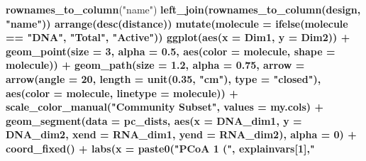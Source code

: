\documentclass[]{article}
\newenvironment{Shaded}{\begin{snugshade}}{\end{snugshade}}
\newcommand{\KeywordTok}[1]{\textcolor[rgb]{0.13,0.29,0.53}{\textbf{#1}}}
\newcommand{\DataTypeTok}[1]{\textcolor[rgb]{0.13,0.29,0.53}{#1}}
\newcommand{\DecValTok}[1]{\textcolor[rgb]{0.00,0.00,0.81}{#1}}
\newcommand{\FloatTok}[1]{\textcolor[rgb]{0.00,0.00,0.81}{#1}}
\newcommand{\StringTok}[1]{\textcolor[rgb]{0.31,0.60,0.02}{#1}}
\newcommand{\OperatorTok}[1]{\textcolor[rgb]{0.81,0.36,0.00}{\textbf{#1}}}
\newcommand{\NormalTok}[1]{#1}
\begin{document}
\begin{Shaded}
\begin{Highlighting}[]
{{{{{\StringTok{  }\KeywordTok{rownames_to_column}\NormalTok{(}\StringTok{"name"}\NormalTok{) }\OperatorTok{%
\StringTok{  }\KeywordTok{left_join}\NormalTok{(}\KeywordTok{rownames_to_column}\NormalTok{(design, }\StringTok{"name"}\NormalTok{)) }\OperatorTok{%
\StringTok{  }\KeywordTok{arrange}\NormalTok{(}\KeywordTok{desc}\NormalTok{(distance)) }\OperatorTok{%
\StringTok{  }\KeywordTok{mutate}\NormalTok{(}\DataTypeTok{molecule =} \KeywordTok{ifelse}\NormalTok{(molecule }\OperatorTok{==}\StringTok{ "DNA"}\NormalTok{, }\StringTok{"Total"}\NormalTok{, }\StringTok{"Active"}\NormalTok{)) }\OperatorTok{%
\StringTok{  }\KeywordTok{ggplot}\NormalTok{(}\KeywordTok{aes}\NormalTok{(}\DataTypeTok{x =}\NormalTok{ Dim1, }\DataTypeTok{y =}\NormalTok{ Dim2)) }\OperatorTok{+}
\StringTok{  }\KeywordTok{geom_point}\NormalTok{(}\DataTypeTok{size =} \DecValTok{3}\NormalTok{, }\DataTypeTok{alpha =} \FloatTok{0.5}\NormalTok{, }\KeywordTok{aes}\NormalTok{(}\DataTypeTok{color =}\NormalTok{ molecule, }\DataTypeTok{shape =}\NormalTok{ molecule)) }\OperatorTok{+}\StringTok{ }
\StringTok{  }\KeywordTok{geom_path}\NormalTok{(}\DataTypeTok{size =} \FloatTok{1.2}\NormalTok{, }\DataTypeTok{alpha =} \FloatTok{0.75}\NormalTok{, }\DataTypeTok{arrow =} \KeywordTok{arrow}\NormalTok{(}\DataTypeTok{angle =} \DecValTok{20}\NormalTok{,}
                          \DataTypeTok{length =} \KeywordTok{unit}\NormalTok{(}\FloatTok{0.35}\NormalTok{, }\StringTok{"cm"}\NormalTok{),}
                          \DataTypeTok{type =} \StringTok{"closed"}\NormalTok{), }\KeywordTok{aes}\NormalTok{(}\DataTypeTok{color =}\NormalTok{ molecule, }\DataTypeTok{linetype =}\NormalTok{ molecule)) }\OperatorTok{+}
\StringTok{  }\KeywordTok{scale_color_manual}\NormalTok{(}\StringTok{"Community Subset"}\NormalTok{, }\DataTypeTok{values =}\NormalTok{ my.cols) }\OperatorTok{+}
\StringTok{  }\KeywordTok{geom_segment}\NormalTok{(}\DataTypeTok{data =}\NormalTok{ pc_dists,}
               \KeywordTok{aes}\NormalTok{(}\DataTypeTok{x =}\NormalTok{ DNA_dim1, }\DataTypeTok{y =}\NormalTok{ DNA_dim2,}
                   \DataTypeTok{xend =}\NormalTok{ RNA_dim1, }\DataTypeTok{yend =}\NormalTok{ RNA_dim2),}
               \DataTypeTok{alpha =} \DecValTok{0}\NormalTok{) }\OperatorTok{+}
\StringTok{  }\KeywordTok{coord_fixed}\NormalTok{() }\OperatorTok{+}
\StringTok{  }\KeywordTok{labs}\NormalTok{(}\DataTypeTok{x =} \KeywordTok{paste0}\NormalTok{(}\StringTok{"PCoA 1 ("}\NormalTok{, explainvars[}\DecValTok{1}\NormalTok{],}\StringTok{"%
}}}}}}}}}}
\end{Highlighting}
\end{Shaded}
\end{document}

